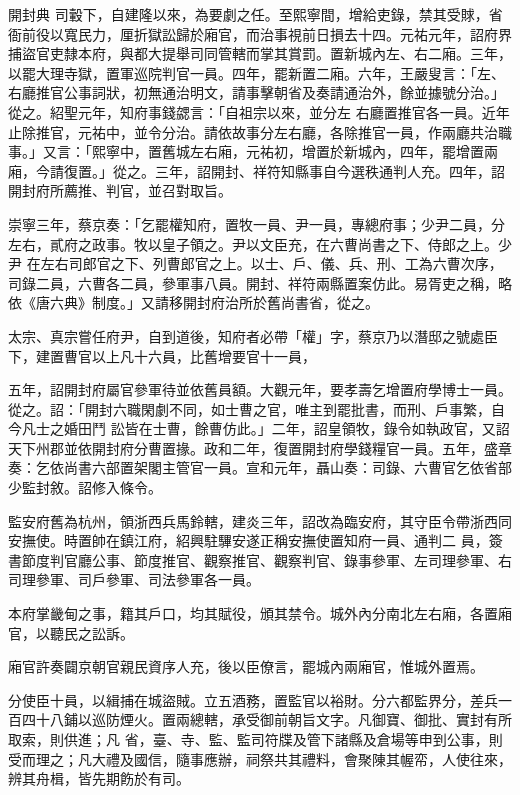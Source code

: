 \begin{pinyinscope}
 開封典
 司轂下，自建隆以來，為要劇之任。至熙寧間，增給吏錄，禁其受賕，省衙前役以寬民力，厘折獄訟歸於廂官，而治事視前日損去十四。元祐元年，詔府界捕盜官吏隸本府，與都大提舉司同管轄而掌其賞罰。置新城內左、右二廂。三年，以罷大理寺獄，置軍巡院判官一員。四年，罷新置二廂。六年，王嚴叟言：「左、右廳推官公事詞狀，初無通治明文，請事擊朝省及奏請通治外，餘並據號分治。」從之。紹聖元年，知府事錢勰言：「自祖宗以來，並分左
 右廳置推官各一員。近年止除推官，元祐中，並令分治。請依故事分左右廳，各除推官一員，作兩廳共治職事。」又言：「熙寧中，置舊城左右廂，元祐初，增置於新城內，四年，罷增置兩廂，今請復置。」從之。三年，詔開封、祥符知縣事自今選秩通判人充。四年，詔開封府所薦推、判官，並召對取旨。



 崇寧三年，蔡京奏：「乞罷權知府，置牧一員、尹一員，專總府事；少尹二員，分左右，貳府之政事。牧以皇子領之。尹以文臣充，在六曹尚書之下、侍郎之上。少尹
 在左右司郎官之下、列曹郎官之上。以士、戶、儀、兵、刑、工為六曹次序，司錄二員，六曹各二員，參軍事八員。開封、祥符兩縣置案仿此。易胥吏之稱，略依《唐六典》制度。」又請移開封府治所於舊尚書省，從之。



 太宗、真宗嘗任府尹，自到道後，知府者必帶「權」字，蔡京乃以潛邸之號處臣下，建置曹官以上凡十六員，比舊增要官十一員，



 五年，詔開封府屬官參軍待並依舊員額。大觀元年，要孝壽乞增置府學博士一員。從之。詔：「開封六職閑劇不同，如士曹之官，唯主到罷批書，而刑、戶事繁，自今凡士之婚田鬥
 訟皆在士曹，餘曹仿此。」二年，詔皇領牧，錄令如執政官，又詔天下州郡並依開封府分曹置掾。政和二年，復置開封府學錢糧官一員。五年，盛章奏：乞依尚書六部置架閣主管官一員。宣和元年，聶山奏：司錄、六曹官乞依省部少監封敘。詔修入條令。



 監安府舊為杭州，領浙西兵馬鈴轄，建炎三年，詔改為臨安府，其守臣令帶浙西同安撫使。時置帥在鎮江府，紹興駐驆安遂正稱安撫使置知府一員、通判二
 員，簽書節度判官廳公事、節度推官、觀察推官、觀察判官、錄事參軍、左司理參軍、右司理參軍、司戶參軍、司法參軍各一員。



 本府掌畿甸之事，籍其戶口，均其賦役，頒其禁令。城外內分南北左右廂，各置廂官，以聽民之訟訴。



 廂官許奏闢京朝官親民資序人充，後以臣僚言，罷城內兩廂官，惟城外置焉。



 分使臣十員，以緝捕在城盜賊。立五酒務，置監官以裕財。分六都監界分，差兵一百四十八鋪以巡防煙火。置兩總轄，承受御前朝旨文字。凡御寶、御批、實封有所取索，則供進；凡
 省，臺、寺、監、監司符牒及管下諸縣及倉場等申到公事，則受而理之；凡大禮及國信，隨事應辦，祠祭共其禮料，會聚陳其幄帟，人使往來，辨其舟楫，皆先期飭於有司。




\end{pinyinscope}
